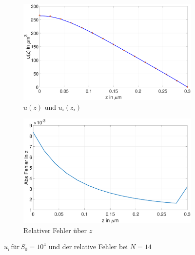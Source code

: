 \begin{figure}[h]
	\begin{subfigure}[b]{0.5\textwidth}
		\includegraphics[width=\textwidth]{figures/station_gl_2_2/S3}
		\caption{$u(z)$ und $u_{i}(z_i)$}
	\end{subfigure}
	\hfill
	\begin{subfigure}[b]{0.5\textwidth}
		\includegraphics[width=1\linewidth]{figures/station_gl_2_2/S3_fehler}
		\caption{Relativer Fehler über $z$}
	\end{subfigure}
	\caption{$u_i \,\text{für} \, S_0=10^4$ und der relative Fehler bei $N=14$ }
\end{figure}